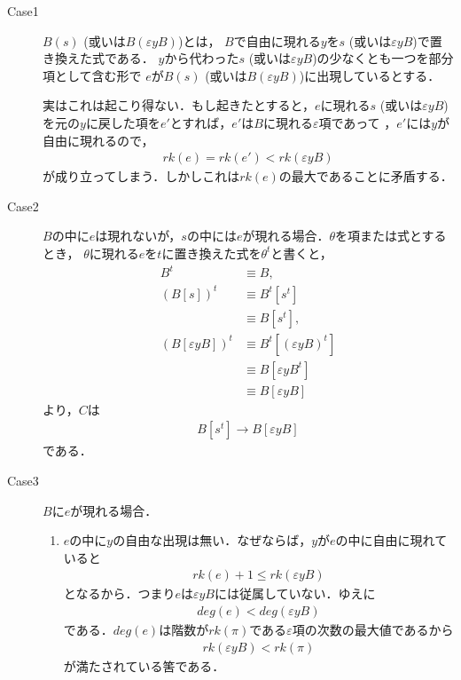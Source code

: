 	\begin{sketch}\mbox{}
		\begin{description}
			\item[Case1]
				$B(s)$ (或いは$B(\varepsilon y B)$)とは，
				$B$で自由に現れる$y$を$s$ (或いは$\varepsilon y B$)で置き換えた式である．
				$y$から代わった$s$ (或いは$\varepsilon y B$)の少なくとも一つを部分項として含む形で
				$e$が$B(s)$ (或いは$B(\varepsilon y B)$)に出現しているとする．
				
				実はこれは起こり得ない．もし起きたとすると，$e$に現れる$s$ (或いは$\varepsilon y B$)
				を元の$y$に戻した項を$e'$とすれば，$e'$は$B$に現れる$\varepsilon$項であって
				\footnotemark，$e'$には$y$が自由に現れるので，
				\begin{align}
					rk(e) = rk(e') < rk(\varepsilon y B)
				\end{align}
				が成り立ってしまう．しかしこれは$rk(e)$の最大であることに矛盾する．
				
			\item[Case2]
				$B$の中に$e$は現れないが，$s$の中には$e$が現れる場合．$\theta$を項または式とするとき，
				$\theta$に現れる$e$を$t$に置き換えた式を$\theta^{t}$と書くと，
				\begin{align}
					B^{t} &\equiv B, \\
					(B[s])^{t} &\equiv B^{t}[s^{t}] \\
					&\equiv B[s^{t}], \\
					(B[\varepsilon y B])^{t} &\equiv B^{t}[(\varepsilon y B)^{t}] \\
					&\equiv B[\varepsilon y B^{t}] \\
					&\equiv B[\varepsilon y B]
				\end{align}
				より，$C$は
				\begin{align}
					B[s^{t}] \rightarrow B[\varepsilon y B]
				\end{align}
				である．
				
			\item[Case3]
				$B$に$e$が現れる場合．
				\begin{enumerate}
					\item $e$の中に$y$の自由な出現は無い．なぜならば，$y$が$e$の中に自由に現れていると
						\begin{align}
							rk(e) + 1 \leq rk(\varepsilon y B)
						\end{align}
						となるから．つまり$e$は$\varepsilon y B$には従属していない．ゆえに
						\begin{align}
							deg(e) < deg(\varepsilon y B)
						\end{align}
						である．$deg(e)$は階数が$rk(\pi)$である$\varepsilon$項の次数の最大値であるから
						\begin{align}
							rk(\varepsilon y B) < rk(\pi)
						\end{align}
						が満たされている筈である．
					

\end{enumerate}
\end{description}
\end{sketch}

